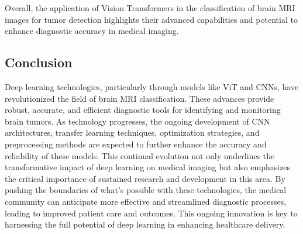 Overall, the application of Vision Transformers in the classification of brain MRI images for tumor detection highlights their advanced capabilities and potential to enhance diagnostic accuracy in medical imaging.


\subsection{Conclusion}


Deep learning technologies, particularly through models like ViT and CNNs, have revolutionized the field of brain MRI classification. These advances provide robust, accurate, and efficient diagnostic tools for identifying and monitoring brain tumors. As technology progresses, the ongoing development of CNN architectures, transfer learning techniques, optimization strategies, and preprocessing methods are expected to further enhance the accuracy and reliability of these models. This continual evolution not only underlines the transformative impact of deep learning on medical imaging but also emphasizes the critical importance of sustained research and development in this area. By pushing the boundaries of what's possible with these technologies, the medical community can anticipate more effective and streamlined diagnostic processes, leading to improved patient care and outcomes. This ongoing innovation is key to harnessing the full potential of deep learning in enhancing healthcare delivery.